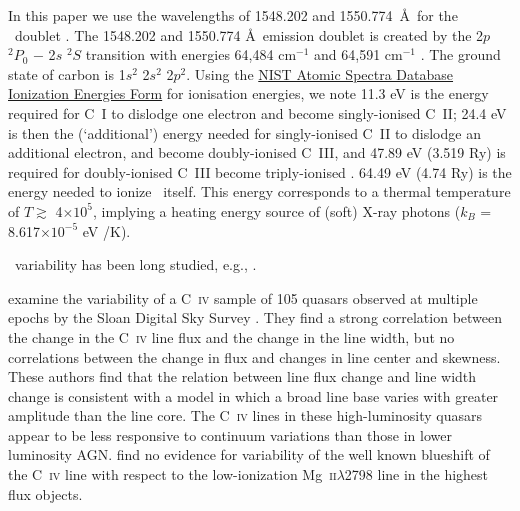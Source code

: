 \documentclass[a4paper,fleqn,usenatbib]{mnras}
\begin{document}
In this paper we use the wavelengths of 1548.202 and 1550.774~\AA\ for
the \civ\ doublet \citep{Kramida2018}.  The 1548.202 and 1550.774 \AA\
emission doublet is created by the 2$p$ $^{2}P_{0}$ $-$ 2$s$ $^{2}S$
transition with energies 64,484 cm$^{-1}$ and 64,591 cm$^{-1}$
\citep[e.g.][]{Moore1993}.  The ground state of carbon is 1$s^2$
2$s^2$ 2$p^2$.  Using the
\href{https://physics.nist.gov/PhysRefData/ASD/ionEnergy.html}{NIST
Atomic Spectra Database Ionization Energies Form} for ionisation
energies, we note 11.3 eV is the energy required for C~I to dislodge
one electron and become singly-ionised C~II; 24.4 eV is then the
(`additional') energy needed for singly-ionised C~II to dislodge an
additional electron, and become doubly-ionised C~III, and 47.89 eV
(3.519 Ry) is required for doubly-ionised C~III become triply-ionised
\civ.  64.49 eV (4.74 Ry) is the energy needed to ionize \civ\
itself. This energy corresponds to a thermal temperature of $T
\gtrsim$ 4$\times10^{5}$, implying a heating energy source of (soft)
X-ray photons ($k_{B}$ = 8.617$\times 10^{-5}$ eV /K).



\civ\ variability has been long studied, e.g., \citet[][]{Baldwin1977,
Gaskell1982, Gregory1982, Wilkes1986, Espey1989, Espey1990Erratum,
ZhengSulentic1990, Corbin1990, Corbin1991, Weymann1991,
Dimitrijevic1992, TytlerFan1992, Wills1993, Brotherton1994, Osmer1994,
Laor1995, McIntosh1999, Nazarova2003}.

\citet{Wilhite2006} examine the variability of a C~\textsc{iv} sample
of 105 quasars observed at multiple epochs by the Sloan Digital Sky
Survey \citep[SDSS;][]{York2000, Stoughton2002, Abazajian2009}.  They
find a strong correlation between the change in the C~\textsc{iv} line
flux and the change in the line width, but no correlations between the
change in flux and changes in line center and skewness.  These authors
find that the relation between line flux change and line width change
is consistent with a model in which a broad line base varies with
greater amplitude than the line core. The C~\textsc{iv} lines in these
high-luminosity quasars appear to be less responsive to continuum
variations than those in lower luminosity AGN.  \citet{Wilhite2006}
find no evidence for variability of the well known blueshift of the
C~\textsc{iv} line with respect to the low-ionization
Mg~\textsc{ii}$\lambda$2798 line in the highest flux objects.
\end{document}

